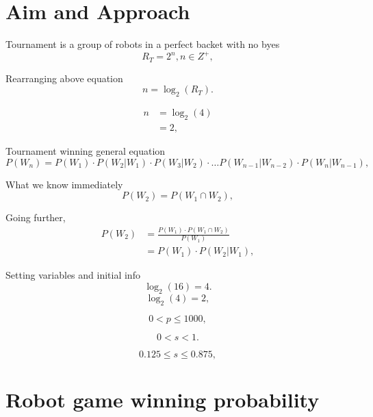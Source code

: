 \documentclass[11pt]{article}
\begin{document}
\section{Aim and Approach}

Tournament is a group of robots in a perfect backet with no byes
\begin{equation*}
    R_T = 2^n, n \in Z^+,
\end{equation*}

Rearranging above equation
\begin{equation*}
    n = \log_2(R_T).
\end{equation*}

\begin{align*}
    n &= \log_2(4)\\
    &= 2,
\end{align*}

Tournament winning general equation
\begin{equation*}
    P(W_n) = P(W_1) \cdot P(W_2 | W_1) \cdot P(W_3 | W_2) \cdot \dots P(W_{n-1} | W_{n-2}) \cdot P(W_n | W_{n-1}),
\end{equation*}

What we know immediately
\begin{equation*}
    P(W_2) = P(W_1 \cap W_2),
\end{equation*}

Going further,
\begin{align*}
    P(W_2) &= \frac{P(W_1) \cdot P(W_1 \cap W_2)}{P(W_1)}\\
    &= P(W_1) \cdot P(W_2 | W_1),
\end{align*}

Setting variables and initial info
\begin{equation*}
    \log_2(16) = 4.
\end{equation*}
\begin{equation*}
    \log_2(4) = 2,
\end{equation*}

\begin{equation*}
    0 < p \leq 1000,
\end{equation*}

\begin{equation*}
    0 < s < 1.
\end{equation*}

\begin{equation*}
    0.125 \leq s \leq 0.875,
\end{equation*}

\section{Robot game winning probability}
\end{document}
